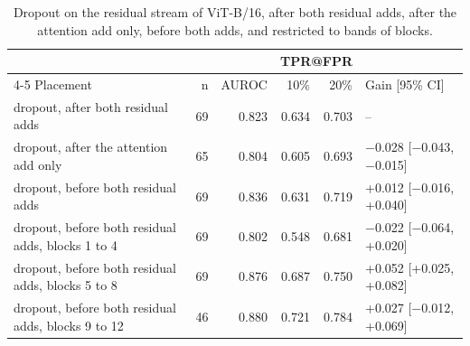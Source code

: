 \begin{table}[htbp]
\centering
\small
\caption{Dropout on the residual stream of ViT-B/16, after both residual adds, after the attention add only, before both adds, and restricted to bands of blocks.}
\label{tab:staircase-residual}
\begin{tabular}{lrrrrl}
\toprule
 & & & \multicolumn{2}{c}{TPR@FPR} & \\
\cmidrule(lr){4-5}
Placement & n & AUROC & 10\% & 20\% & Gain [95\% CI] \\
\midrule
dropout, after both residual adds & 69 & 0.823 & 0.634 & 0.703 & -- \\
dropout, after the attention add only & 65 & 0.804 & 0.605 & 0.693 & $-$0.028 [$-$0.043, $-$0.015] \\
dropout, before both residual adds & 69 & 0.836 & 0.631 & 0.719 & +0.012 [$-$0.016, +0.040] \\
dropout, before both residual adds, blocks 1 to 4 & 69 & 0.802 & 0.548 & 0.681 & $-$0.022 [$-$0.064, +0.020] \\
dropout, before both residual adds, blocks 5 to 8 & 69 & 0.876 & 0.687 & 0.750 & +0.052 [+0.025, +0.082] \\
dropout, before both residual adds, blocks 9 to 12 & 46 & 0.880 & 0.721 & 0.784 & +0.027 [$-$0.012, +0.069] \\
\bottomrule
\end{tabular}
\end{table}
